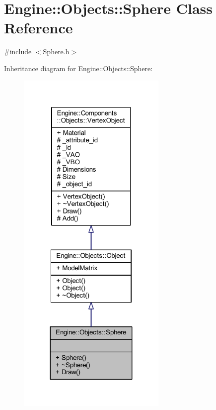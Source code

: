 \hypertarget{classEngine_1_1Objects_1_1Sphere}{}\section{Engine\+:\+:Objects\+:\+:Sphere Class Reference}
\label{classEngine_1_1Objects_1_1Sphere}


{\ttfamily \#include $<$Sphere.\+h$>$}



Inheritance diagram for Engine\+:\+:Objects\+:\+:Sphere\+:
\nopagebreak
\begin{figure}[H]
\begin{center}
\leavevmode
\includegraphics[width=203pt]{classEngine_1_1Objects_1_1Sphere__inherit__graph}
\end{center}
\end{figure}


